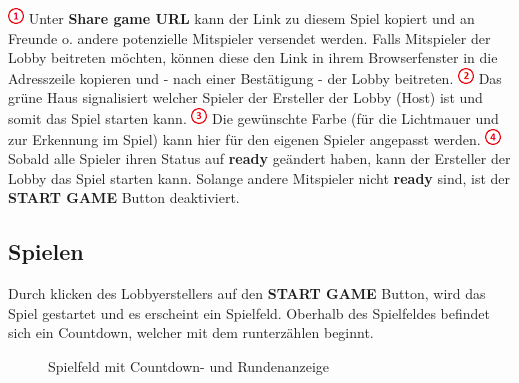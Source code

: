 \documentclass[11pt,ngerman]{article}
\begin{document}
    \noindent \includegraphics{figures/1.png} Unter \textbf{Share game URL} kann der Link zu diesem Spiel kopiert und an Freunde o. andere potenzielle Mitspieler versendet werden. Falls Mitspieler der Lobby beitreten möchten, können diese den Link in ihrem Browserfenster in die Adresszeile kopieren und - nach einer Bestätigung - der Lobby beitreten.\newline
    \newline
    \noindent \includegraphics{figures/2.png} Das grüne Haus signalisiert welcher Spieler der Ersteller der Lobby (Host) ist und somit das Spiel starten kann.\newline
    \newline
    \noindent \includegraphics{figures/3.png} Die gewünschte Farbe (für die Lichtmauer und zur Erkennung im Spiel) kann hier für den eigenen Spieler angepasst werden.\newline
    \newline
    \noindent \includegraphics{figures/4.png} Sobald alle Spieler ihren Status auf \textbf{ready} geändert haben, kann der Ersteller der Lobby das Spiel starten kann. Solange andere Mitspieler nicht \textbf{ready} sind, ist der \textbf{START GAME} Button deaktiviert.

    \subsection{Spielen}

    Durch klicken des Lobbyerstellers auf den \textbf{START GAME} Button, wird das Spiel gestartet und es erscheint ein Spielfeld. Oberhalb des Spielfeldes befindet sich ein Countdown, welcher mit dem runterzählen beginnt.

    \begin{figure}[H]
        \centering
        \caption{Spielfeld mit Countdown- und Rundenanzeige}
        \label{fig:Spielfeld}
    \end{figure}
\end{document}
